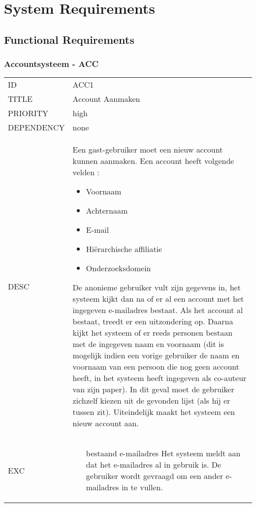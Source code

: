 \section{System Requirements}

\subsection{Functional Requirements}

\subsubsection{Accountsysteem - ACC}

\begin{longtable}{lp{10cm}}
ID           & ACC1\\
TITLE        & Account Aanmaken \\
PRIORITY     & high \\
DEPENDENCY   & none \\
DESC         & Een gast-gebruiker moet een nieuw account kunnen aanmaken.
Een account heeft volgende velden :
\begin{itemize}
  \item Voornaam
  \item Achternaam
  \item E-mail
  \item Hiërarchische affiliatie
  \item Onderzoeksdomein
\end{itemize}
De anonieme gebruiker vult zijn gegevens in, het systeem kijkt dan na of er al een account met het ingegeven e-mailadres bestaat. Als het account al bestaat, treedt er een uitzondering op.
Daarna kijkt het systeem of er reeds personen bestaan met de ingegeven naam en voornaam 
(dit is mogelijk indien een vorige gebruiker de naam en voornaam van een persoon die nog geen account heeft, in het systeem heeft ingegeven als co-auteur van zijn paper). 
In dit geval moet de gebruiker zichzelf kiezen uit de gevonden lijst (als hij er tussen zit).
Uiteindelijk maakt het systeem een nieuw account aan.\\
EXC          &
\begin{itemize}
\item [bestaand e-mailadres] Het systeem meldt aan dat het e-mailadres al in gebruik is. De gebruiker wordt gevraagd om een ander e-mailadres in te vullen.
\end{itemize}
\end{longtable}

